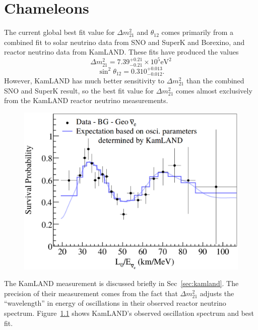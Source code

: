\chapter{Chameleons}
\label{sec:chameleons}

\ifpdf
    \graphicspath{{chameleons}{chameleons/figures/PDF/}{chameleons/figures/}}
\else
    \graphicspath{{chameleons/figures/EPS/}{chameleons/figures/}}
\fi


The current global best fit value for  $\Delta m^{2}_{21}$ and
$\theta_{12}$ comes
primarily from a combined fit to solar neutrino data from SNO
and SuperK and Borexino, and reactor neutrino data from KamLAND\@.
These fits have produced the values
\begin{equation}
    \Delta m^{2}_{21} = 7.39^{+0.21}_{-0.21}\times10^5 \text{eV}^{2}
\end{equation}
\begin{equation}
    \sin^2\theta_{12} = 0.310^{+0.013}_{-0.012}\text{.}
\end{equation}
However, KamLAND has much better sensitivity to $\Delta m^{2}_{21}$
than the combined SNO and SuperK result, so the best fit value for
$\Delta m^{2}_{21}$ comes almost exclusively from the KamLAND
reactor neutrino measurements.
\begin{figure}[htbp]
    \centering
    \includegraphics[width=\textwidth]{kamland_oscillation}
    \caption[]{}
    \label{fig:kamland_oscillation}
\end{figure}
The KamLAND measurement is discussed briefly in Sec~\ref{sec:kamland}.
The precision of their measurement comes from the fact that $\Delta m^{2}_{21}$
adjusts the ``wavelength'' in energy of oscillations in their observed
reactor neutrino spectrum.
Figure~\ref{fig:kamland_oscillation} shows KamLAND's observed oscillation
spectrum and best fit.

